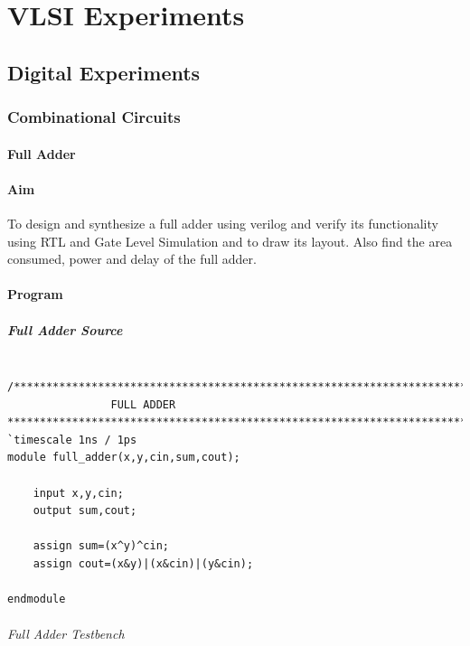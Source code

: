 \part{VLSI Experiments}
\chapter{Digital Experiments}
\section{Combinational Circuits}

\subsection{Full Adder}

\subsection*{Aim}

To design and synthesize  a full adder using  verilog and verify its functionality using RTL and Gate Level Simulation and to draw its layout.  Also find the area consumed, power and delay of the full adder.

\subsection*{Program}
\subsubsection*{Full Adder Source}
\begin{Verbatim}

/***************************************************************************
				FULL ADDER	
***************************************************************************/
`timescale 1ns / 1ps
module full_adder(x,y,cin,sum,cout);

	input x,y,cin;
	output sum,cout;
	
	assign sum=(x^y)^cin;
	assign cout=(x&y)|(x&cin)|(y&cin);
	
endmodule

\end{Verbatim}
\pagebreak


\paragraph{Full Adder Testbench}

